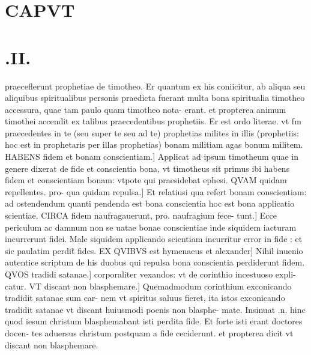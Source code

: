 \documentclass{article}
\begin{document}
\begin{pages}
\section*{CAPVT }
\section*{.II. }
\marginpar{[ p.141 ]}\pstart praeceflerunt prophetiae de timotheo. Er quantum ex his coniicitur, ab aliqua seu aliquibus spiritualibus personis praedicta fuerant multa bona spiritualia timotheo accessura, quae tam paulo quam timotheo nota- erant. et propterea animum timothei accendit ex talibus praecedentibus prophetiis. Er est ordo literae. vt fm praecedentes in te (seu super te seu ad te) prophetias milites in illis (prophetiis: hoc est in prophetaris per illas prophetias) bonam militiam  agas bonum militem. HABENS fidem et bonam conscientiam.] Applicat ad ipsum timotheum quae in genere dixerat de fide et conscientia bona, vt timotheus sit primus ibi habens fidem et conscientiam bonam: vtpote qui praesidebat ephesi. QVAM quidam repellentes. pro- qua quidam repulsa.] Et relatiusi qua refert bonam conscientiam: ad ostendendum quanti pendenda est bona conscientia  hoc est bona applicatio scientiae. CIRCA fidem naufragauerunt, pro. naufragium fece- tunt.] Ecce periculum ac damnum non se uatae bonae conscientiae inde siquidem iacturam incurrerunt fidei. Male siquidem applicando scientiam  incurritur error in fide : et sic paulatim perdit̃ fides. EX QVIBVS est hymenaeus et alexander] Nihil inuenio autentice scriptum de his duobus qui repulsa bona conscientia perdiderunt fidem. QVOS tradidi satanae.] corporaliter vexandos: vt de corinthio incestuoso expli- catur. VT discant non blasphemare.] Quemadmodum corinthium exconicando tradidit satanae sum car- nem vt spiritus saluus fieret, ita istos exconicando tradidit satanae vt discant huiusmodi poenis non blasphe- mate. Insinuat .n. hinc quod iesum christum blasphemabant isti perdita fide. Et forte isti erant doctores docen- tes aduersus christum postquam a fide ceciderunt. et propterea dicit vt discant non blasphemare.  \pend

\end{pages}
\end{document}
